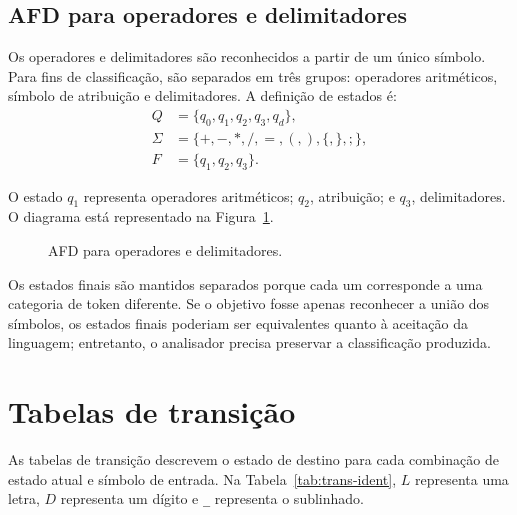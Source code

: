 \documentclass[12pt,a4paper]{article}
\begin{document}
\subsection{AFD para operadores e delimitadores}

Os operadores e delimitadores são reconhecidos a partir de um único símbolo.
Para fins de classificação, são separados em três grupos: operadores
aritméticos, símbolo de atribuição e delimitadores. A definição de estados é:
\[
\begin{aligned}
Q &= \{q_0,q_1,q_2,q_3,q_d\},\\
\Sigma &= \{+,-,*,/,=,(,),\{,\},;\},\\
F &= \{q_1,q_2,q_3\}.
\end{aligned}
\]

O estado $q_1$ representa operadores aritméticos; $q_2$, atribuição; e
$q_3$, delimitadores. O diagrama está representado na
Figura~\ref{fig:afd-operadores}.

\begin{figure}[H]
\centering
{}
\caption{AFD para operadores e delimitadores.}
\label{fig:afd-operadores}
\end{figure}

Os estados finais são mantidos separados porque cada um corresponde a uma
categoria de token diferente. Se o objetivo fosse apenas reconhecer a união
dos símbolos, os estados finais poderiam ser equivalentes quanto à aceitação
da linguagem; entretanto, o analisador precisa preservar a classificação
produzida.

\section{Tabelas de transição}

As tabelas de transição descrevem o estado de destino para cada combinação
de estado atual e símbolo de entrada. Na Tabela~\ref{tab:trans-ident}, $L$
representa uma letra, $D$ representa um dígito e \texttt{\_} representa o
sublinhado.
\end{document}

